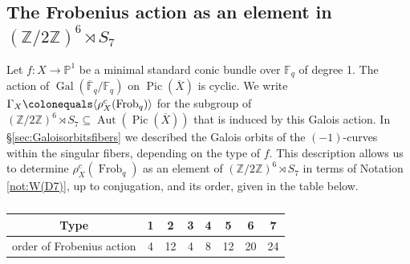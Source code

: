 \documentclass[a4paper, 11pt, reqno]{amsart}
\numberwithin{equation}{section} \numberwithin{figure}{section}
\DeclareMathOperator{\Pic}{Pic}
\DeclareMathOperator{\Gal}{Gal}
\DeclareMathOperator{\Aut}{Aut}
\DeclareMathOperator{\Frob}{Frob}
\def \F {{\mathbb F}}
\def \P {{\mathbb P}}
\def \Z {{\mathbb Z}}
\newcommand{\ra}{\rightarrow}
\theoremstyle{definition}
\numberwithin{lemma}{section}
\begin{document}
\subsection{The Frobenius action as an element in $(\Z/2\Z)^{6} \rtimes S_7$}\label{sec:conjugacyclassfrob}

Let $f \colon X \ra \P^1$ be a minimal standard conic bundle over $\F_q$ of degree 1. The action of $\Gal(\overline{\F}_q/\F_q)$ on $\Pic(\overline{X})$ is cyclic. We write $\Gamma_X \colonequals \langle \rho_X^c(\Frob_q)\rangle$ for the subgroup of $(\Z/2\Z)^{6} \rtimes S_7 \subseteq \Aut(\Pic(\overline{X}))$ that is induced by this Galois action. In \S\ref{sec:Galoisorbitsfibers} we described the Galois orbits of the $(-1)$-curves within the singular fibers, depending on the type of $f$. This description allows us to determine $\rho_X^c(\Frob_q)$ as an element of $(\Z/2\Z)^{6} \rtimes S_7$ in terms of Notation \ref{not:W(D7)}, up to conjugation, and its order, given in the table below.
\begin{table}[h]
    \centering
    \begin{tabular}{c|c c c c c c c}
        Type & 1 & 2 &3 &4 &5 &6 & 7\\
        \hline
        order of Frobenius action & 4 & 12 & 4 & 8 & 12 & 20 & 24
    \end{tabular}
    \caption{}
    \label{tab:orders}
\end{table}
\end{document}
